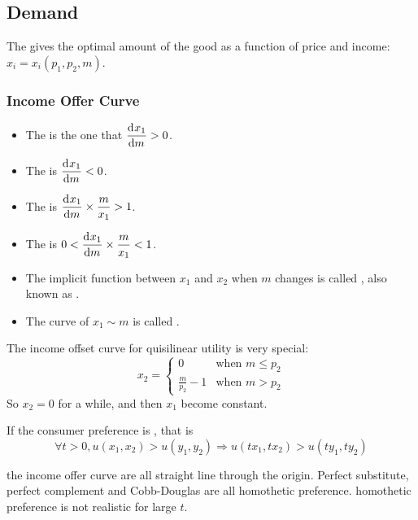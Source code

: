 \subsection{Demand}

The  gives the optimal amount of the good as a function of price and income: $x_i = x_i(p_1, p_2, m)$.

\subsubsection{Income Offer Curve}

\begin{itemize}
    \item The  is the one that $\dod{x_1}{m} > 0$.
    \item The  is $\dod{x_1}{m} < 0$.
    \item The  is $\displaystyle \dod{x_1}{m} \times \frac{m}{x_1} > 1$.
    \item The  is $\displaystyle 0 < \dod{x_1}{m} \times \frac{m}{x_1} < 1$.
    \item The implicit function between $x_1$ and $x_2$ when $m$ changes is called , also known as .
    \item The curve of $x_1 \sim m$ is called .
\end{itemize}

\begin{example}
    The income offset curve for quisilinear utility is very special:
    \begin{equation}
        x_2 = \begin{cases}
            0 & \text{when } m \leq p_2 \\
            \displaystyle \frac{m}{p_2} - 1 & \text{when } m > p_2
        \end{cases}
    \end{equation}
    So $x_2 = 0$ for a while, and then $x_1$ become constant.
\end{example}




\begin{theorem}
    If the consumer preference is , that is 
    \begin{equation}
        \forall t > 0, u(x_1,x_2) > u(y_1,y_2) \Rightarrow u(t x_1,t x_2) > u(t y_1,t y_2)
    \end{equation}    

    the income offer curve are all straight line through the origin. Perfect substitute, perfect complement and Cobb-Douglas are all homothetic preference. homothetic preference is not realistic for large $t$.
\end{theorem}


